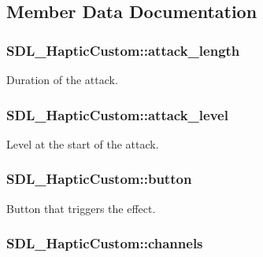 \subsection{Member Data Documentation}
\hypertarget{struct_s_d_l___haptic_custom_a018b35d89398c26e10d1fb4315d1dda1}{
\subsubsection[{attack\-\_\-length}]{ S\-D\-L\-\_\-\-Haptic\-Custom\-::attack\-\_\-length}}\label{struct_s_d_l___haptic_custom_a018b35d89398c26e10d1fb4315d1dda1}
Duration of the attack. \hypertarget{struct_s_d_l___haptic_custom_ad6e394e3775372af3eb9e02823987405}{
\subsubsection[{attack\-\_\-level}]{ S\-D\-L\-\_\-\-Haptic\-Custom\-::attack\-\_\-level}}\label{struct_s_d_l___haptic_custom_ad6e394e3775372af3eb9e02823987405}
Level at the start of the attack. \hypertarget{struct_s_d_l___haptic_custom_aa4fbaf7220f3197aa6631b3e64ad6562}{
\subsubsection[{button}]{ S\-D\-L\-\_\-\-Haptic\-Custom\-::button}}\label{struct_s_d_l___haptic_custom_aa4fbaf7220f3197aa6631b3e64ad6562}
Button that triggers the effect. \hypertarget{struct_s_d_l___haptic_custom_a560215762e9096d583d75867d9227cf5}{
\subsubsection[{channels}]{ S\-D\-L\-\_\-\-Haptic\-Custom\-::channels}}\label{struct_s_d_l___haptic_custom_a560215762e9096d583d75867d9227cf5}
